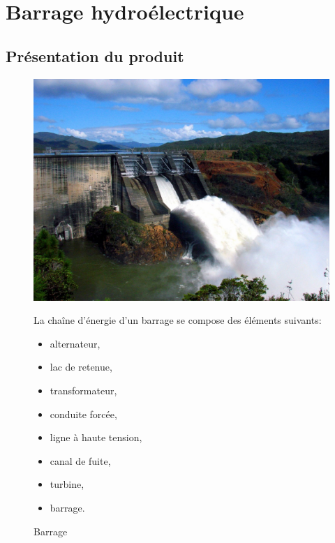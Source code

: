 \newpage

\section{Barrage hydroélectrique}


\subsection{Présentation du produit}

\begin{figure}[htbp]
\begin{minipage}[c]{.50\linewidth}
\begin{center}
\includegraphics[width=\linewidth]{img/barrage.jpg}
\caption{Barrage}
\label{fig:image4}
\end{center}
\end{minipage}
\hfill
\begin{minipage}[c]{.40\linewidth}
La chaîne d'énergie d'un barrage se compose des éléments suivants: 
\begin{itemize}
 \item alternateur,
 \item lac de retenue,
 \item transformateur,
 \item conduite forcée,
 \item ligne à haute tension,
 \item canal de fuite,
 \item turbine,
 \item barrage.
\end{itemize}
\end{minipage}
\end{figure}

